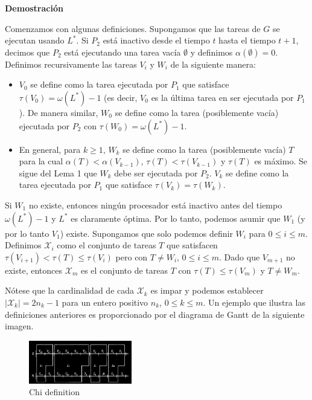 \documentclass[14pt]{extarticle}
\begin{document}
\textbf{Demostración}

Comenzamos con algunas definiciones. Supongamos que las tareas de $G$ se ejecutan usando $L^*$. Si $P_2$ está inactivo desde el tiempo $t$ hasta el tiempo $t+1$, decimos que $P_2$ está ejecutando una tarea vacía $\emptyset$ y definimos $\alpha(\emptyset) = 0$. Definimos recursivamente las tareas $V_i$ y $W_i$ de la siguiente manera:

\begin{itemize}
    \item $V_0$ se define como la tarea ejecutada por $P_1$ que satisface $\tau(V_0) = \omega(L^*) - 1$ (es decir, $V_0$ es la última tarea en ser ejecutada por $P_1$). De manera similar, $W_0$ se define como la tarea (posiblemente vacía) ejecutada por $P_2$ con $\tau(W_0) = \omega(L^*) - 1$.
    \item En general, para $k \geq 1$, $W_k$ se define como la tarea (posiblemente vacía) $T$ para la cual $\alpha(T) < \alpha(V_{k-1})$, $\tau(T) < \tau(V_{k-1})$ y $\tau(T)$ es máximo. Se sigue del Lema 1 que $W_k$ debe ser ejecutada por $P_2$. $V_k$ se define como la tarea ejecutada por $P_1$ que satisface $\tau(V_k) = \tau(W_k)$.
\end{itemize}

Si $W_1$ no existe, entonces ningún procesador está inactivo antes del tiempo $\omega(L^*) - 1$ y $L^*$ es claramente óptima. Por lo tanto, podemos asumir que $W_1$ (y por lo tanto $V_1$) existe. Supongamos que solo podemos definir $W_i$ para $0 \leq i \leq m$. Definimos $\mathcal{X}_i$ como el conjunto de tareas $T$ que satisfacen $\tau(V_{i+1}) < \tau(T) \leq \tau(V_i)$ pero con $T \neq W_i$, $0 \leq i \leq m$. Dado que $V_{m+1}$ no existe, entonces $\mathcal{X}_m$ es el conjunto de tareas $T$ con $\tau(T) \leq \tau(V_m)$ y $T \neq W_m$.

Nótese que la cardinalidad de cada $\mathcal{X}_k$ es impar y podemos establecer $|\mathcal{X}_k| = 2n_k - 1$ para un entero positivo $n_k$, $0 \leq k \leq m$. Un ejemplo que ilustra las definiciones anteriores es proporcionado por el diagrama de Gantt de la siguiente imagen.

\begin{figure}[h]
    \centering
    \includegraphics[width=0.4\textwidth]{images/chi_gantt.png}
    \caption{Chi definition}
\end{figure}
\end{document}
